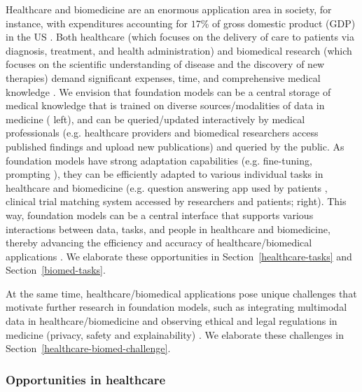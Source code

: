 Healthcare and biomedicine are an enormous application area in society, for instance, with expenditures accounting for $17$\% of gross domestic product (GDP) in the US \citep{swensen2011controlling,van_Hartskamp_2019,keehan2020national}. Both healthcare (which focuses on the delivery of care to patients via diagnosis, treatment, and health administration) and biomedical research (which focuses on the scientific understanding of disease and the discovery of new therapies) demand significant expenses, time, and comprehensive medical knowledge \citep{yu2018artificial,korngiebel2021considering}. We envision that foundation models can be a central storage of medical knowledge that is trained on diverse sources/modalities of data in medicine \citep{krumholz2016data,soltanian2019multimodal,suresh2020deep} ( left), and can be queried/updated interactively by medical professionals (e.g. healthcare providers and biomedical researchers access published findings and upload new publications) \citep{ionescu2020deep} and queried by the public. As foundation models have strong adaptation capabilities (e.g. fine-tuning, prompting \citep{brown2020gpt3}), they can be efficiently adapted to various individual tasks in healthcare and biomedicine (e.g. question answering app used by patients \citep{klasnja2012healthcare, zhu2019hierarchical,daniel2019towards,liu2020interpretable}, clinical trial matching system \citep{ni2015automated,harrer2019artificial,beck2020artificial} accessed by researchers and patients;  right). This way, foundation models can be a central interface that supports various interactions between data, tasks, and people in healthcare and biomedicine, thereby advancing the efficiency and accuracy of healthcare/biomedical applications \citep{elbattah2021role}. We elaborate these opportunities in Section~\ref{healthcare-tasks} and Section~\ref{biomed-tasks}.

At the same time, healthcare/biomedical applications pose unique challenges that motivate further research in foundation models, such as integrating multimodal data in healthcare/biomedicine \citep{miura2020improving,fenglincompetence2021} and observing ethical and legal regulations in medicine (privacy, safety and explainability) \citep{guan2019artificial,xu2019translating}. We elaborate these challenges in Section~\ref{healthcare-biomed-challenge}.

\subsubsection{Opportunities in healthcare}
\label{sec:healthcare-tasks}

